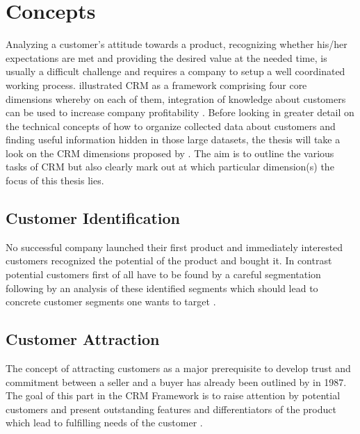 \section{Concepts}
Analyzing a customer's attitude towards a product, recognizing whether his/her expectations are met and providing the desired value at the needed time, is usually a difficult challenge and requires a company to setup a well coordinated working process. \cite{Ngai2009} illustrated CRM as a framework comprising four core dimensions whereby on each of them, integration of knowledge about customers can be used to increase company profitability \cite{neckel2015}. Before looking in greater detail on the technical concepts of how to organize collected data about customers and finding useful information hidden in those large datasets, the thesis will take a look on the CRM dimensions proposed by \cite{swift2001accelerating}. The aim is to outline the various tasks of CRM but also clearly mark out at which particular dimension(s) the focus of this thesis lies. 

\subsection{Customer Identification}
No successful company launched their first product and immediately interested customers recognized the potential of the product and bought it. In contrast potential customers first of all have to be found by a careful segmentation following by an analysis of these identified segments which should lead to concrete customer segments one wants to target \cite{swift2001accelerating} \cite{Ngai2009}. 

\subsection{Customer Attraction}
The concept of attracting customers as a major prerequisite to develop trust and commitment between a seller and a buyer has already been outlined by \cite{dwyer1987developing} in 1987. The goal of this part in the CRM Framework is to raise attention by potential customers and present outstanding features and differentiators of the product which lead to fulfilling needs of the customer \cite{ellegaard2006customer}. 


